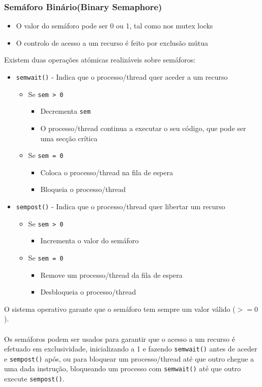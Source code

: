 \documentclass[10pt,a4paper]{report}
\begin{document}
\subsubsection{Semáforo Binário(Binary Semaphore)}
\begin{itemize}
\item O valor do semáforo pode ser 0 ou 1, tal como nos mutex locks
\item O controlo de acesso a um recurso é feito por exclusão mútua
\end{itemize}
\vspace{0.4cm}
Existem duas operações atómicas realizáveis sobre semáforos:
\begin{itemize}
\item \texttt{sem\textunderscore wait()} - Indica que o processo/thread quer aceder a um recurso
\begin{itemize}
\item Se \texttt{sem > 0}
\begin{itemize}
\item Decrementa \texttt{sem}
\item O processo/thread continua a executar o seu código, que pode ser uma secção crítica
\end{itemize}
\item Se \texttt{sem = 0}
\begin{itemize}
\item Coloca o processo/thread na fila de espera
\item Bloqueia o processo/thread
\end{itemize}
\end{itemize}
\item \texttt{sem\textunderscore post()} - Indica que o processo/thread quer libertar um recurso
\begin{itemize}
\item Se \texttt{sem > 0}
\begin{itemize}
\item Incrementa o valor do semáforo
\end{itemize}
\item Se \texttt{sem = 0}
\begin{itemize}
\item Remove um processo/thread da fila de espera
\item Desbloqueia o processo/thread
\end{itemize}
\end{itemize}
\end{itemize}
O sistema operativo garante que o semáforo tem sempre um valor válido ($>= 0$).\\
\\
Os semáforos podem ser usados para garantir que o acesso a um recurso é efetuado em exclusividade, inicializando a 1 e fazendo \texttt{sem\textunderscore wait()} antes de aceder e \texttt{sem\textunderscore post()} após, ou para bloquear um processo/thread até que outro chegue a uma dada instrução, bloqueando um processo com \texttt{sem\textunderscore wait()} até que outro execute \texttt{sem\textunderscore post()}.
\end{document}

